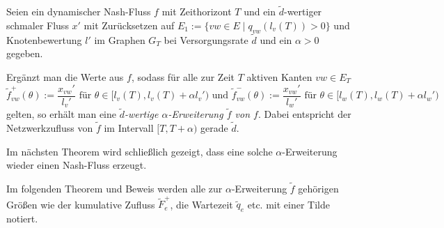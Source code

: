 \begin{definition}
	Seien ein dynamischer Nash-Fluss $f$ mit Zeithorizont $T$ und ein $\tilde{d}$-wertiger schmaler Fluss $x'$ mit Zurücksetzen auf $E_1 := \{ vw\in E \mid q_{vw}(l_v(T)) > 0 \} $ und Knotenbewertung $l'$ im Graphen $G_T$ bei Versorgungsrate $\tilde{d}$ und ein $\alpha > 0$ gegeben.
	
	Ergänzt man die Werte aus $f$, sodass für alle zur Zeit $T$ aktiven Kanten $vw\in E_T$
	\[ \tilde{f}_{vw}^+(\theta):= \frac{x_{vw}'}{l_v'} \text{ für $\theta\in [l_v(T), l_v(T)+\alpha l_v')$ und } \tilde{f}_{vw}^-(\theta):=\frac{x_{vw}'}{l_w'} \text{ für $\theta\in [l_w(T), l_w(T)+\alpha l_w')$} \]
	gelten, so erhält man eine \emph{$\tilde{d}$-wertige $\alpha$-Erweiterung $\tilde{f}$ von $f$}.
	Dabei entspricht der Netzwerkzufluss von $\tilde{f}$ im Intervall $[T, T+\alpha)$ gerade $\tilde{d}$.
\end{definition}

Im nächsten Theorem wird schließlich gezeigt, dass eine solche $\alpha$-Erweiterung wieder einen Nash-Fluss erzeugt.

\begin{notation}
	Im folgenden Theorem und Beweis werden alle zur $\alpha$-Erweiterung $\tilde{f}$ gehörigen Größen wie der kumulative Zufluss $\tilde{F}_e^+$, die Wartezeit $\tilde{q}_e$ etc. mit einer Tilde notiert.
\end{notation}

